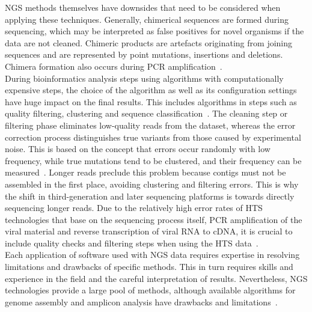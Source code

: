 \ac{NGS} methods themselves have downsides that need to be considered when applying these techniques. Generally, chimerical sequences are formed during sequencing, which may be interpreted as false positives for novel organisms if the data are not cleaned. Chimeric products are artefacts originating from joining sequences and are represented by point mutations, insertions and deletions. Chimera formation also occurs during \ac{PCR} amplification~\cite{zylstra1998pcr}.\\
During bioinformatics analysis steps using algorithms with computationally expensive steps, the choice of the algorithm as well as its configuration settings have huge impact on the final results. This includes algorithms in steps such as quality filtering, clustering and sequence classification~\cite{kopylova2016open}. The cleaning step or filtering phase eliminates low-quality reads from the dataset, whereas the error correction process distinguishes true variants from those caused by experimental noise. This is based on the concept that errors occur randomly with low frequency, while true mutations tend to be clustered, and their frequency can be measured~\cite{zagordi2010error}. Longer reads preclude this problem because contigs must not be assembled in the first place, avoiding clustering and filtering errors. This is why the shift in third-generation and later sequencing platforms is towards directly sequencing longer reads. Due to the relatively high error rates of \ac{HTS} technologies that base on the sequencing process itself, \ac{PCR} amplification of the viral material and reverse transcription of viral \ac{RNA} to \ac{cDNA}, it is crucial to include quality checks and filtering steps when using the \ac{HTS} data~\cite{beerenwinkel2012challenges}. \\
Each application of software used with \ac{NGS} data requires expertise in resolving limitations and drawbacks of specific methods. This in turn requires skills and experience in the field and the careful interpretation of results. Nevertheless, \ac{NGS} technologies provide a large pool of methods, although available algorithms for genome assembly and amplicon analysis have drawbacks and limitations~\cite{finotello2012comparative}.

